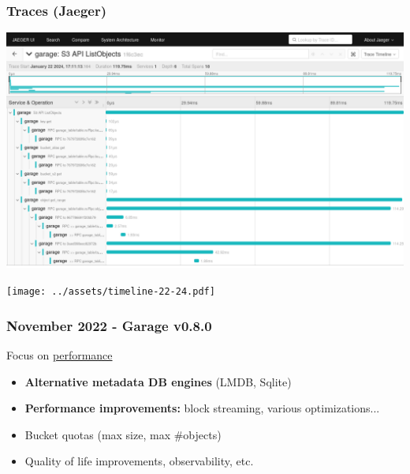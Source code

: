 \documentclass[aspectratio=169,xcolor={svgnames}]{beamer}
\begin{document}
\begin{frame}
	\frametitle{Traces (Jaeger)}
	\begin{center}
		\includegraphics[width=.8\linewidth]{../assets/screenshots/jaeger_listobjects.png}
	\end{center}
\end{frame}


\begin{frame}
	\begin{center}
		\texttt{[image: ../assets/timeline-22-24.pdf]}
	\end{center}
\end{frame}

\begin{frame}
	\frametitle{November 2022 - Garage v0.8.0}
	Focus on \underline{performance}
	\vspace{2em}
	\begin{itemize}
		\item \textbf{Alternative metadata DB engines} (LMDB, Sqlite)
			\vspace{1em}
		\item \textbf{Performance improvements:} block streaming, various optimizations...
			\vspace{1em}
		\item Bucket quotas (max size, max \#objects)
			\vspace{1em}
		\item Quality of life improvements, observability, etc.
	\end{itemize}
\end{frame}
\end{document}
